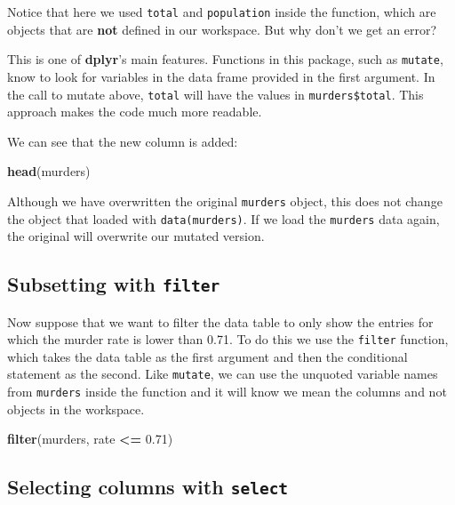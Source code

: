 \documentclass[
]{krantz}
\newenvironment{Shaded}{\begin{snugshade}}{\end{snugshade}}
\newcommand{\FloatTok}[1]{\textcolor[rgb]{0.06,0.06,0.06}{#1}}
\newcommand{\KeywordTok}[1]{\textcolor[rgb]{0.27,0.27,0.27}{\textbf{#1}}}
\newcommand{\NormalTok}[1]{#1}
\newcommand{\OperatorTok}[1]{\textcolor[rgb]{0.43,0.43,0.43}{\textbf{#1}}}
\newcommand{\StringTok}[1]{\textcolor[rgb]{0.5,0.5,0.5}{#1}}
\begin{document}
Notice that here we used \texttt{total} and \texttt{population} inside the function, which are objects that are \textbf{not} defined in our workspace. But why don't we get an error?

This is one of \textbf{dplyr}'s main features. Functions in this package, such as \texttt{mutate}, know to look for variables in the data frame provided in the first argument. In the call to mutate above, \texttt{total} will have the values in \texttt{murders\$total}. This approach makes the code much more readable.

We can see that the new column is added:

\begin{Shaded}
\begin{Highlighting}[]
\KeywordTok{head}\NormalTok{(murders)}
\end{Highlighting}
\end{Shaded}

Although we have overwritten the original \texttt{murders} object, this does not change the object that loaded with \texttt{data(murders)}. If we load the \texttt{murders} data again, the original will overwrite our mutated version.

\hypertarget{subsetting-with-filter}{%
\subsection{\texorpdfstring{Subsetting with \texttt{filter}}{Subsetting with filter}}\label{subsetting-with-filter}}

Now suppose that we want to filter the data table to only show the entries for which the murder rate is lower than 0.71. To do this we use the \texttt{filter} function, which takes the data table as the first argument and then the conditional statement as the second. Like \texttt{mutate}, we can use the unquoted variable names from \texttt{murders} inside the function and it will know we mean the columns and not objects in the workspace.

\begin{Shaded}
\begin{Highlighting}[]
\KeywordTok{filter}\NormalTok{(murders, rate }\OperatorTok{<=}\StringTok{ }\FloatTok{0.71}\NormalTok{)}
\end{Highlighting}
\end{Shaded}

\hypertarget{selecting-columns-with-select}{%
\subsection{\texorpdfstring{Selecting columns with \texttt{select}}{Selecting columns with select}}\label{selecting-columns-with-select}}
\end{document}
